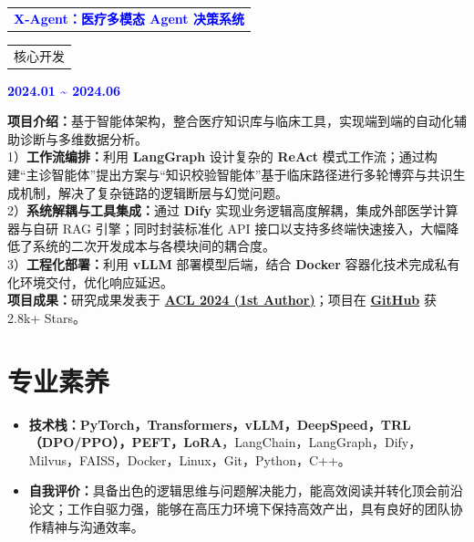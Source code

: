 \documentclass[10.5pt, a4paper]{ctexart}
\begin{document}
\noindent
\begin{tabular}{@{}p{8cm}@{}} 
    \textcolor{blue}{\textbf{X-Agent：医疗多模态 Agent 决策系统}} 
\end{tabular}
\begin{tabular}{@{}p{6cm}@{}} 
    核心开发 
\end{tabular}
\hfill\textcolor{blue}{\textbf{2024.01 \textasciitilde{} 2024.06}}

\par\noindent
\textbf{项目介绍：}基于智能体架构，整合医疗知识库与临床工具，实现端到端的自动化辅助诊断与多维数据分析。 \\
1）\textbf{工作流编排：}利用 \textbf{LangGraph} 设计复杂的 \textbf{ReAct} 模式工作流；通过构建“主诊智能体”提出方案与“知识校验智能体”基于临床路径进行多轮博弈与共识生成机制，解决了复杂链路的逻辑断层与幻觉问题。\\
2）\textbf{系统解耦与工具集成：}通过 \textbf{Dify} 实现业务逻辑高度解耦，集成外部医学计算器与自研 RAG 引擎；同时封装标准化 API 接口以支持多终端快速接入，大幅降低了系统的二次开发成本与各模块间的耦合度。 \\
3）\textbf{工程化部署：}利用 \textbf{vLLM} 部署模型后端，结合 \textbf{Docker} 容器化技术完成私有化环境交付，优化响应延迟。 \\
\textbf{项目成果：}研究成果发表于 \href{https://2024.aclweb.org/program/main_conference_papers/}{\textbf{ACL 2024 (1st Author)}}；项目在 \href{https://github.com/your-username/x-agent-med}{\textbf{GitHub}} 获 2.8k+ Stars。

\section*{专业素养}
\vspace{-0.5em}
\begin{itemize}
    \item \textbf{技术栈：}\textbf{PyTorch，Transformers，vLLM，DeepSpeed，TRL（DPO/PPO），PEFT，LoRA}，LangChain，LangGraph，Dify，Milvus，FAISS，Docker，Linux，Git，Python，C++。
    \item \textbf{自我评价：}具备出色的逻辑思维与问题解决能力，能高效阅读并转化顶会前沿论文；工作自驱力强，能够在高压力环境下保持高效产出，具有良好的团队协作精神与沟通效率。
\end{itemize}

\label{LastPage}
\end{document}
